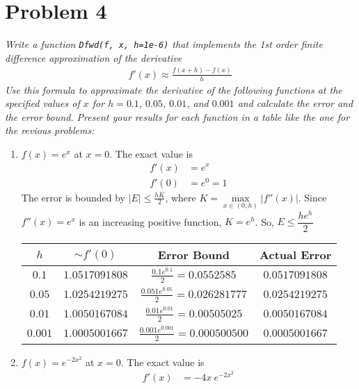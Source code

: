 \documentclass[12pt]{article}
\begin{document}
\pagebreak
\section*{Problem 4}
{\it Write a function {\tt Dfwd(f, x, h=1e-6)} that implements the 1st order finite difference approximation of the derivative}
\begin{align*}
    f'(x) \approx \frac{f(x + h) - f(x)}{h}
\end{align*}
{\it Use this formula to approximate the derivative of the following functions at the specified values of $x$ for $h = 0.1$, $0.05$, $0.01$, and $0.001$ and calculate the error and the error bound.  Present your results for each function in a table like the one for the revious problems:}
\begin{enumerate}[\ \ (a)\ \ ]
    \item $f(x) = e^x$ at $x = 0$.  The exact value is
    \begin{align*}
        f'(x) &= e^x \\
        f'(0) &= e^0 = 1
    \end{align*}
    The error is bounded by $|E| \leq \displaystyle\frac{hK}{2}$, where $K = \max\limits_{x\in(0, h)}\left|f''(x)\right|$.  Since $f''(x) = e^x$ is an increasing positive function, $K = e^h$.  So, $E \leq \dfrac{he^h}{2}$
    \begin{table}[H]
        \begin{tabular}{||c|c|c|c||} \hline\hline
            $h$ & $\sim f'(0)$ & {\bf Error Bound} & {\bf Actual Error} \\ \hline
            $0.1$ & $1.0517091808$ & $\frac{0.1e^{0.1}}{2} = 0.0552585$ & $0.0517091808$ \\ \hline
            $0.05$ & $1.0254219275$ & $\frac{0.051e^{0.05}}{2} = 0.026281777$ & $0.0254219275$ \\ \hline
            $0.01$ & $1.0050167084$ & $\frac{0.01e^{0.01}}{2} = 0.00505025$ & $0.0050167084$ \\ \hline
            $0.001$ & $1.0005001667$ & $\frac{0.001e^{0.001}}{2} = 0.000500500$ & $0.0005001667$ \\ \hline \hline
        \end{tabular}
    \end{table}
    \item $f(x) = e^{-2x^2}$ at $x = 0$.  The exact value is
    \begin{align*}
        f'(x) &= -4x\ e^{-2x^2} \\

\end{align*}
\end{enumerate}
\end{document}
